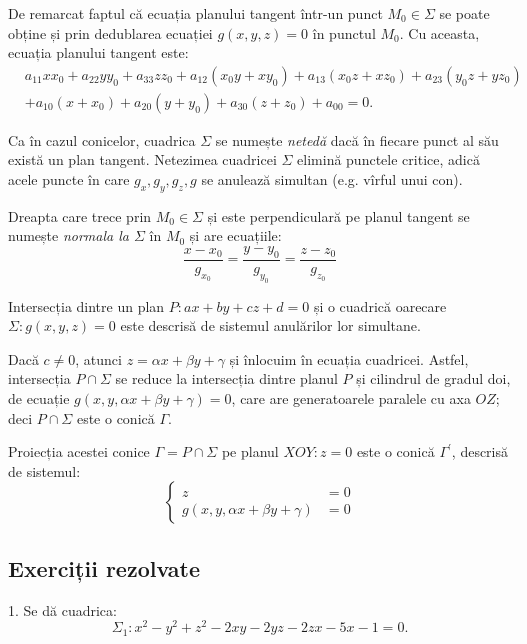 De remarcat faptul că ecuația planului tangent într-un punct $M_0 \in \Sigma$
se poate obține și prin dedublarea ecuației $g(x, y, z) = 0$ în punctul $M_0$.
Cu aceasta, ecuația planului tangent este:
\begin{align*}
	& a_{11} xx_0 + a_{22} yy_0 + a_{33}zz_0 + a_{12}(x_0y + xy_0) +
	    a_{13}(x_0z + xz_0) + a_{23}(y_0 z+ yz_0) \\
	&+ a_{10}(x + x_0) + a_{20}(y + y_0) + a_{30}(z + z_0) + a_{00} = 0.
\end{align*}

Ca în cazul conicelor, cuadrica $\Sigma$ se numește \emph{netedă} dacă în
fiecare punct al său există un plan tangent. Netezimea cuadricei $\Sigma$
elimină punctele critice, adică acele puncte în care $g_x, g_y, g_z, g$ se
anulează simultan (e.g. vîrful unui con).

Dreapta care trece prin $M_0 \in \Sigma$ și este perpendiculară pe planul
tangent se numește \emph{normala la $\Sigma$} în $M_0$ și are ecuațiile: 
 \[
	\dfrac{x - x_0}{g_{x_0}} = \dfrac{y - y_0}{g_{y_0}} =
	\dfrac{z - z_0}{g_{z_0}}
\]

Intersecția dintre un plan $P: ax + by + cz + d = 0$ și o cuadrică oarecare
$\Sigma: g(x, y, z) = 0$ este descrisă de sistemul anulărilor lor simultane.

Dacă $c \neq 0$, atunci $z = \alpha x + \beta y + \gamma$ și înlocuim în
ecuația cuadricei. Astfel, intersecția $P \cap \Sigma$ se reduce la intersecția
dintre planul $P$ și cilindrul de gradul doi, de ecuație
$g(x, y, \alpha x + \beta y + \gamma) = 0$, care are generatoarele paralele
cu axa $OZ$; deci $P \cap \Sigma$ este o conică $\Gamma$.

Proiecția acestei conice $\Gamma = P \cap \Sigma$ pe planul $XOY: z = 0$ este o 
conică $\Gamma^{\prime}$, descrisă de sistemul: 
 \[
	\begin{cases}	
	    z &= 0\\
	    g(x, y, \alpha x + \beta y + \gamma) &= 0
    \end{cases}
\]


\subsection{Exerciții rezolvate}

1. Se dă cuadrica: 
 \[
	\Sigma_1 : x^2 - y^2 + z^2 - 2xy - 2yz - 2zx - 5x - 1 = 0.
\]


